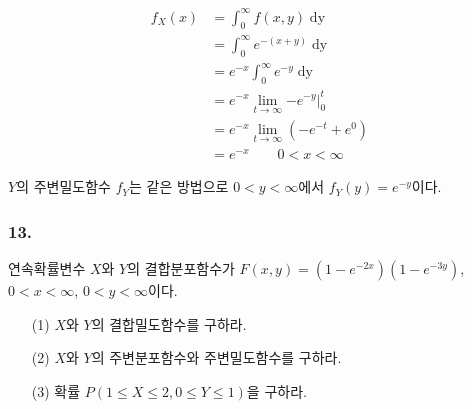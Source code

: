\begin{align*}
	f_X\left(x\right) &= \int_0^\infty f\left(x, y\right) \mathop{dy}\\
	&= \int_0^\infty e^{-\left(x + y\right)} \mathop{dy}\\
	&= e^{-x} \int_0^\infty e^{-y} \mathop{dy}\\
	&= e^{-x} \lim_{t\rightarrow\infty} \left. -e^{-y} \right|_0^t\\
	&= e^{-x} \lim_{t\rightarrow\infty} \left(-e^{-t} + e^0\right)\\
	&= e^{-x} \qquad 0<x<\infty
\end{align*}

$Y$의 주변밀도함수 $f_Y$는 같은 방법으로 $0<y<\infty$에서 $f_Y\left(y\right) = e^{-y}$이다.

\subsubsection{13.} 연속확률변수 $X$와 $Y$의 결합분포함수가 $F\left(x, y\right) = \left(1-e^{-2x}\right)\left(1-e^{-3y}\right)$, $0<x<\infty$, $0<y<\infty$이다.
\begin{itemize}
  \item [(1)] $X$와 $Y$의 결합밀도함수를 구하라.
  \item [(2)] $X$와 $Y$의 주변분포함수와 주변밀도함수를 구하라.
  \item [(3)] 확률 $P\left(1\leq X\leq 2, 0\leq Y\leq 1\right)$을 구하라.
\end{itemize}

